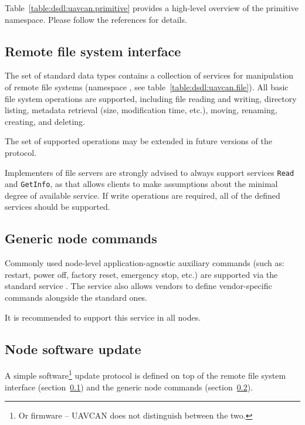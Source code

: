 Table~\ref{table:dsdl:uavcan.primitive} provides a high-level overview of the primitive namespace.
Please follow the references for details.


\subsection{Remote file system interface}\label{sec:application_functions_file_system}

The set of standard data types contains a collection of services for manipulation of remote file systems
(namespace , see table~\ref{table:dsdl:uavcan.file}).
All basic file system operations are supported, including file reading and writing,
directory listing, metadata retrieval (size, modification time, etc.), moving, renaming, creating, and deleting.

The set of supported operations may be extended in future versions of the protocol.

Implementers of file servers are strongly advised to always support services \verb|Read| and \verb|GetInfo|,
as that allows clients to make assumptions about the minimal degree of available service.
If write operations are required, all of the defined services should be supported.


\subsection{Generic node commands}\label{sec:application_functions_generic_commands}

Commonly used node-level application-agnostic auxiliary commands
(such as: restart, power off, factory reset, emergency stop, etc.)
are supported via the standard service .
The service also allows vendors to define vendor-specific commands alongside the standard ones.

It is recommended to support this service in all nodes.

\subsection{Node software update}

A simple software\footnote{Or firmware -- UAVCAN does not distinguish between the two.}
update protocol is defined on top of the remote file system interface
(section~\ref{sec:application_functions_file_system})
and the generic node commands (section~\ref{sec:application_functions_generic_commands}).


